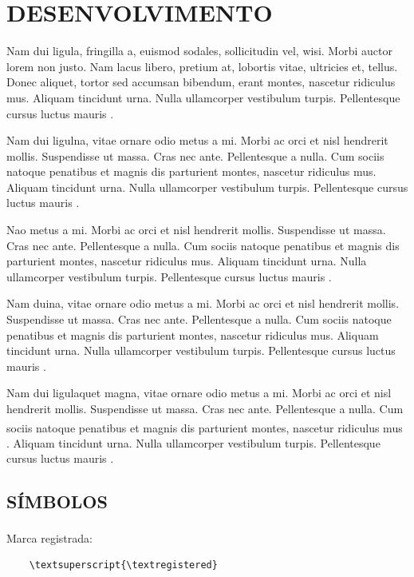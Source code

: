 \chapter{DESENVOLVIMENTO}

Nam dui ligula, fringilla a, euismod sodales, sollicitudin vel, wisi. Morbi auctor lorem non justo. Nam lacus libero, pretium at, lobortis vitae, ultricies et, tellus. Donec aliquet, tortor sed accumsan bibendum, erant montes, nascetur ridiculus mus. Aliquam tincidunt urna. Nulla ullamcorper vestibulum turpis. Pellentesque cursus luctus mauris \cite{LUCKMANN2008,fitzgerald2014}.

Nam dui ligulna, vitae ornare odio metus a mi. Morbi ac orci et nisl hendrerit mollis. Suspendisse ut massa. Cras nec ante. Pellentesque a nulla. Cum sociis natoque penatibus et magnis dis parturient montes, nascetur ridiculus mus. Aliquam tincidunt urna. Nulla ullamcorper vestibulum turpis. Pellentesque cursus luctus mauris \cite{Telles1984}.

Nao metus a mi. Morbi ac orci et nisl hendrerit mollis. Suspendisse ut massa. Cras nec ante. Pellentesque a nulla. Cum sociis natoque penatibus et magnis dis parturient montes, nascetur ridiculus mus. Aliquam tincidunt urna. Nulla ullamcorper vestibulum turpis. Pellentesque cursus luctus mauris \cite{abntex2-wiki-como-customizar}.

Nam duina, vitae ornare odio metus a mi. Morbi ac orci et nisl hendrerit mollis. Suspendisse ut massa. Cras nec ante. Pellentesque a nulla. Cum sociis natoque penatibus et magnis dis parturient montes, nascetur ridiculus mus. Aliquam tincidunt urna. Nulla ullamcorper vestibulum turpis. Pellentesque cursus luctus mauris \cite{abntex2modelo}.

Nam dui ligulaquet magna, vitae ornare odio metus a mi. Morbi ac orci et nisl hendrerit mollis. Suspendisse ut massa. Cras nec ante. Pellentesque a nulla. Cum sociis natoque penatibus et magnis dis parturient montes, nascetur ridiculus mus \textsuperscript{\textregistered}. Aliquam tincidunt urna. Nulla ullamcorper vestibulum turpis. Pellentesque cursus luctus mauris \cite{memoir}.
\section{SÍMBOLOS}
Marca registrada\textsuperscript{\textregistered}:
	\begin{verbatim}
	\textsuperscript{\textregistered}
	\end{verbatim}

